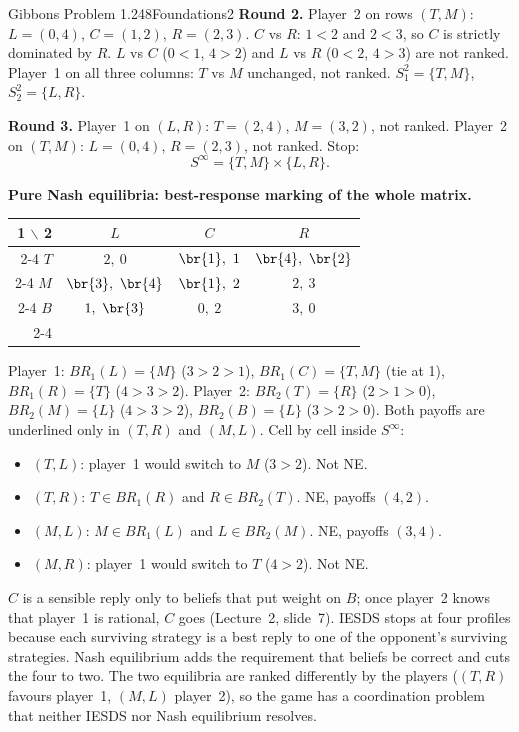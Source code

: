 \begin{exsol}{Gibbons Problem 1.2}{48}{Foundations}{2}
\textbf{Round 2.} Player~2 on rows $(T, M)$: $L = (0,4)$, $C = (1,2)$, $R = (2,3)$.
$C$ vs $R$: $1 < 2$ and $2 < 3$, so $C$ is strictly dominated by $R$. $L$ vs $C$
($0<1$, $4>2$) and $L$ vs $R$ ($0<2$, $4>3$) are not ranked. Player~1 on all three columns:
$T$ vs $M$ unchanged, not ranked. $S_1^2 = \{T,M\}$, $S_2^2 = \{L, R\}$.

\textbf{Round 3.} Player~1 on $(L, R)$: $T = (2, 4)$, $M = (3, 2)$, not ranked. Player~2 on
$(T, M)$: $L = (0, 4)$, $R = (2, 3)$, not ranked. Stop:
\[
  S^\infty = \{T, M\} \times \{L, R\}.
\]

\textbf{Pure Nash equilibria: best-response marking of the whole matrix.}
\begin{center}
\begin{tabular}{r|c|c|c|}
\multicolumn{1}{r}{1 $\backslash$ 2} & \multicolumn{1}{c}{$L$} & \multicolumn{1}{c}{$C$} & \multicolumn{1}{c}{$R$}\\ \cline{2-4}
$T$ & $2,\ 0$ & $\br{1},\ 1$ & $\br{4},\ \br{2}$ \\ \cline{2-4}
$M$ & $\br{3},\ \br{4}$ & $\br{1},\ 2$ & $2,\ 3$ \\ \cline{2-4}
$B$ & $1,\ \br{3}$ & $0,\ 2$ & $3,\ 0$ \\ \cline{2-4}
\end{tabular}
\end{center}
Player~1: $BR_1(L) = \{M\}$ ($3 > 2 > 1$), $BR_1(C) = \{T, M\}$ (tie at 1), $BR_1(R) = \{T\}$
($4 > 3 > 2$). Player~2: $BR_2(T) = \{R\}$ ($2 > 1 > 0$), $BR_2(M) = \{L\}$ ($4 > 3 > 2$),
$BR_2(B) = \{L\}$ ($3 > 2 > 0$). Both payoffs are underlined only in $(T,R)$ and $(M,L)$. Cell by
cell inside $S^\infty$:
\begin{itemize}
  \item $(T, L)$: player~1 would switch to $M$ ($3 > 2$). Not NE.
  \item $(T, R)$: $T \in BR_1(R)$ and $R \in BR_2(T)$. NE, payoffs $(4,2)$.
  \item $(M, L)$: $M \in BR_1(L)$ and $L \in BR_2(M)$. NE, payoffs $(3,4)$.
  \item $(M, R)$: player~1 would switch to $T$ ($4 > 2$). Not NE.
\end{itemize}

\interp $C$ is a sensible reply only to beliefs that put weight on $B$; once player~2 knows that
player~1 is rational, $C$ goes (Lecture~2, slide~7). IESDS stops at four profiles because each
surviving strategy is a best reply to one of the opponent's surviving strategies. Nash
equilibrium adds the requirement that beliefs be correct and cuts the four to two. The two
equilibria are ranked differently by the players ($(T,R)$ favours player~1, $(M,L)$ player~2), so
the game has a coordination problem that neither IESDS nor Nash equilibrium resolves.


\end{exsol}
